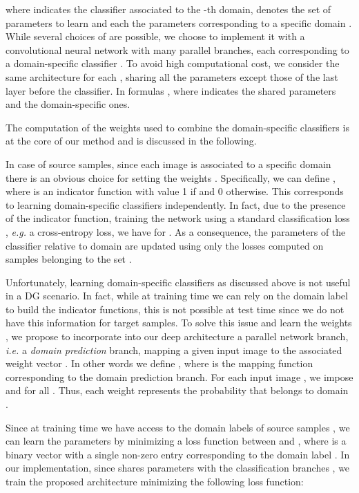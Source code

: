 \documentclass{article}
\begin{document}
 where  indicates the classifier associated to the -th domain,  denotes the set of parameters to learn and each  the parameters corresponding to a specific domain . While several choices of  are possible, we choose to implement it with a convolutional neural network with many parallel branches, each corresponding to a domain-specific classifier . To avoid high computational cost, we consider the same architecture for each , sharing all the parameters except those of the last layer before the classifier. In formulas , where  indicates the shared parameters and  the domain-specific ones.

The computation of the weights  used to combine the domain-specific classifiers is at the core of our method and is discussed in the following.

In case of source samples, since each image is associated to a specific domain there is an obvious choice for setting the weights . Specifically, we can define , where  is an indicator function with value 1 if  and 0 otherwise. 
This corresponds to learning  domain-specific classifiers independently. In fact, due to the presence of the indicator function, training the network using a standard classification loss , \textit{e.g.} a cross-entropy loss, 
we have  for . As a consequence, the parameters  of the classifier relative to domain  are updated using only the losses computed on samples belonging to the set . 


Unfortunately, learning domain-specific classifiers as discussed above is not useful in a DG scenario. In fact, while at training time we can rely on the domain label  to build the indicator functions, this is not possible at test time since we do not have this information for target samples. To solve this issue and learn the weights , we propose to incorporate into our deep architecture a parallel network branch, \textit{i.e.} a \textit{domain prediction} branch, mapping a given input image  to the associated weight vector . In other words we define ,
where  is the mapping function corresponding to the domain prediction branch. For each input image , we impose  and  for all . Thus, each weight  represents the probability that  belongs to domain . 

Since at training time we have access to the domain labels  of source samples , we can learn the parameters  by minimizing a loss function  between  and , where  is a binary vector with a single non-zero entry corresponding to the domain label .
In our implementation, since  shares parameters with the classification branches , we train the proposed architecture minimizing the following loss function:
\vspace{-0.1cm}
 
\end{document}
